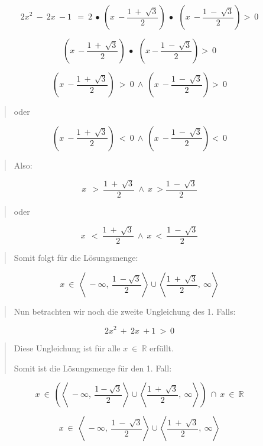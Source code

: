 \documentclass[a4paper, 12pt]{book}
\begin{document}
\begin{longtable}[]
\begin{minipage}[b]{\linewidth}
\[{2x}^{2}\  - \ 2x\  - 1\ \  = \ 2\  \bullet \ (x\  - \frac{1\  + \ \sqrt{3}}{2})\  \bullet \ \ (x\  - \frac{1\  - \ \sqrt{3}}{2}) > \ 0\]

\[(x\  - \frac{1\  + \ \sqrt{3}}{2})\  \bullet \ \ (x - \frac{1\  - \ \sqrt{3}}{2}) > \ 0\]

\[(x\  - \frac{1\  + \ \sqrt{3}}{2})\  > \ 0\  \land \ (x\  - \frac{1\  - \ \sqrt{3}}{2}) > \ 0\]

\begin{quote}
oder
\end{quote}

\[(x\  - \frac{1\  + \ \sqrt{3}}{2})\  < \ 0\  \land \ (x\  - \frac{1\  - \ \sqrt{3}}{2}) < \ 0\]

\begin{quote}
Also:
\end{quote}

\[x\ \  > \ \frac{1\  + \ \sqrt{3}}{2}\  \land \ x\  > \frac{1\  - \ \sqrt{3}}{2}\]

\begin{quote}
oder
\end{quote}

\[x\ \  < \ \frac{1\  + \ \sqrt{3}}{2}\  \land \ x\  < \ \frac{1\  - \ \sqrt{3}}{2}\]

\begin{quote}
Somit folgt für die Lösungsmenge:
\end{quote}

\[x\  \in \ \left\langle \  - \infty,\ \frac{1\  - \sqrt{3}}{2} \right\rangle \cup \left\langle \frac{1\  + \ \sqrt{3}}{2},\ \infty \right\rangle\]

\begin{quote}
Nun betrachten wir noch die zweite Ungleichung des 1. Falls:
\end{quote}

\[{2x}^{2}\  + \ 2x\  + 1\  > \ 0\]

\begin{quote}
Diese Ungleichung ist für alle \(x\mathbb{\  \in \ R}\) erfüllt.

Somit ist die Lösungsmenge für den 1. Fall:
\end{quote}

\[x\  \in \ (\left\langle \  - \infty,\ \frac{1 - \sqrt{3}}{2} \right\rangle \cup \left\langle \frac{1\  + \ \sqrt{3}}{2},\ \infty \right\rangle)\  \cap \ x\mathbb{\  \in \ R}\]

\[x\  \in \ \left\langle \  - \infty,\ \frac{1\  - \ \sqrt{3}}{2} \right\rangle \cup \left\langle \frac{1\  + \ \sqrt{3}}{2},\ \infty \right\rangle\]


\end{minipage}
\end{longtable}
\end{document}

